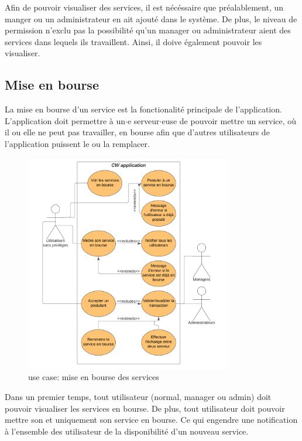 Afin de pouvoir visualiser des services, il est nécéssaire que préalablement, un manger ou un administrateur en ait ajouté dans le système. De plus, le niveau de permission n'exclu pas la possibilité qu'un manager ou administrateur aient des services dans lequels ils travaillent. Ainsi, il doive également pouvoir les visualiser.

\newpage

\subsection*{Mise en bourse}

La mise en bourse d'un service est la fonctionalité principale de l'application. L'application doit permettre à un$\cdot$e serveur$\cdot$euse de pouvoir mettre un service, où il ou elle ne peut pas travailler, en bourse afin que d'autres utilisateurs de l'application puissent le ou la remplacer.
\begin{figure}[!h]
    \begin{center}
        \includegraphics[width= 0.8\textwidth]{uses cases/BourseUC.png}
    \end{center}
    \caption{use case: mise en bourse des services}
\end{figure}

Dans un premier temps, tout utilisateur (normal, manager ou admin) doit pouvoir visualiser les services en bourse.
De plus, tout utilisateur doit pouvoir mettre son et uniquement son service en bourse. Ce qui engendre une notification à l'ensemble des utilisateur de la disponibilité d'un nouveau service. 

